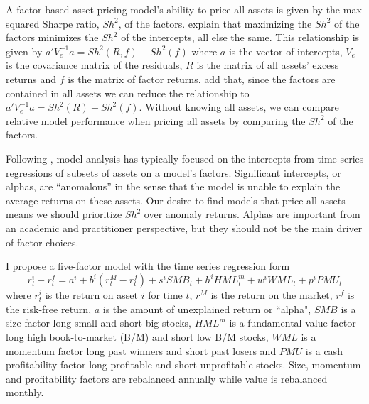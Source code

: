 

A factor-based asset-pricing model’s ability to price all assets is given by the max
squared Sharpe ratio, $Sh^2$, of the factors. \textcite{gibbons1989test} explain that
maximizing the $Sh^2$ of the factors minimizes the $Sh^2$ of the intercepts, all else the
same. This relationship is given by $a'V_e^{-1}a=Sh^2(R, f) -Sh^2(f)$ where $a$ is
the vector of intercepts, $V_e$ is the covariance matrix of the residuals, $R$ is the
matrix of all assets’ excess returns and $f$ is the matrix of factor returns.
\textcite{barillas2016alpha} add that, since the factors are contained in all assets we
can reduce the relationship to $a'V_e^{-1}a = Sh^2(R)-Sh^2(f)$. Without knowing all
assets, we can compare relative model performance when pricing all assets by comparing the
$Sh^2$ of the factors.

Following \textcite{jensen1968performance}, model analysis has typically focused on the
intercepts from time series regressions of subsets of assets on a model’s factors.
Significant intercepts, or alphas, are ``anomalous” in the sense that the model is unable
to explain the average returns on these assets. Our desire to find models that price all
assets means we should prioritize $Sh^2$ over anomaly returns. Alphas are important from
an academic and practitioner perspective, but they should not be the main driver of factor
choices.

I propose a five-factor model with the time series regression form
\begin{equation}
\label{eq:m1}
r_t^i-r_t^f=a^i+b^i\left( r_t^M-r_t^f\right) +s^iSMB_t+h^iHML_t^m+w^iWML_t+p^iPMU_t
\end{equation}
where
$r_t^i$ is the return on asset $i$ for time $t$,
$r^M$ is the return on the market,
$r^f$ is the risk-free return,
$a$ is the amount of unexplained return or ``alpha",
$SMB$ is a size factor long small and short big stocks,
$HML^m$ is a fundamental value factor long high book-to-market (B/M) and short low B/M stocks,
$WML$ is a momentum factor long past winners and short past losers and
$PMU$ is a cash profitability factor long profitable and short unprofitable stocks.
Size, momentum and profitability factors are rebalanced annually while value is rebalanced monthly.

